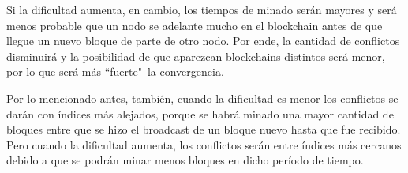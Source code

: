 Si la dificultad aumenta, en cambio, los tiempos de minado serán mayores y será menos probable que un nodo se adelante mucho en el blockchain antes de que llegue un nuevo bloque de parte de otro nodo. Por ende, la cantidad de conflictos disminuirá y la posibilidad de que aparezcan blockchains distintos será menor, por lo que será más ``fuerte"\ la convergencia.

Por lo mencionado antes, también, cuando la dificultad es menor los conflictos se darán con índices más alejados, porque se habrá minado una mayor cantidad de bloques entre que se hizo el broadcast de un bloque nuevo hasta que fue recibido. Pero cuando la dificultad aumenta, los conflictos serán entre índices más cercanos debido a que se podrán minar menos bloques en dicho período de tiempo.